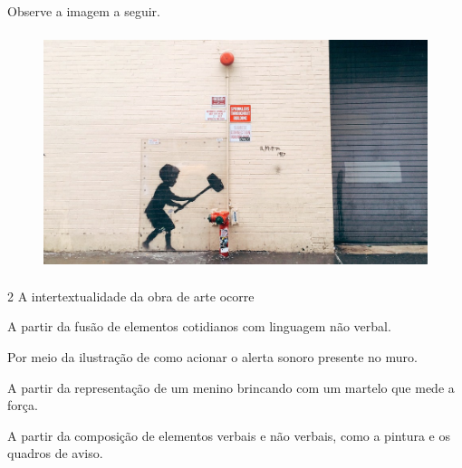 


Observe a imagem a seguir.

\begin{figure}[H]
\centering\includegraphics[width=4.69016in,height=2.73611in]{./imgSAEB_6_POR/media/image13.jpeg}
\end{figure}

\num{2} A intertextualidade da obra de arte ocorre

\begin{escolha}
\item A partir da fusão de elementos cotidianos com linguagem não verbal.
\item Por meio da ilustração de como acionar o alerta sonoro presente no
muro.
\item A partir da representação de um menino brincando com um martelo que
mede a força.
\item A partir da composição de elementos verbais e não verbais, como a
pintura e os quadros de aviso.
\end{escolha}

